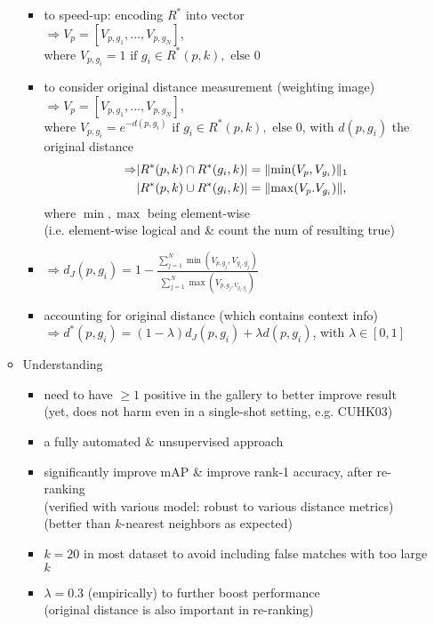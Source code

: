 \begin{itemize}
\begin{itemize}
\begin{itemize}
		\item to speed-up: encoding $R^*$ into vector \\
		$\Rightarrow V_p=[V_{p,g_1}, ..., V_{p,g_N}]$, \\
		where $V_{p,g_i} = 1 \text{ if } g_i\in R^*(p,k), \text{ else } 0$
		\item to consider original distance measurement (weighting image) \\
		$\Rightarrow V_p=[V_{p,g_1}, ..., V_{p,g_N}]$, \\
		where $V_{p,g_i} = e^{-d(p,g_i)} \text{ if } g_i\in R^*(p,k), \text{ else } 0$, with $d(p,g_i)$ the original distance
		\Item \begin{align*} \Rightarrow & \lvert R^*(p,k)\cap R^*(g_i,k)\rvert = \lVert\min(V_p, V_{g_i})\rVert_1 \\ & \lvert R^*(p,k)\cup R^*(g_i,k)\rvert = \lVert\max(V_p. V_{g_i})\rVert, \end{align*} where $\min, \max$ being element-wise \\
		(i.e. element-wise logical and \& count the num of resulting true)
		\item $\displaystyle \Rightarrow d_J(p,g_i) = 1-\frac{\sum_{j=1}^N \min(V_{p,g_j}, V_{g_i, g_j})} {\sum_{j=1}^N \max(V_{p,g_j, V_{g_i, g_j}}) }$
		\item accounting for original distance (which contains context info) \\
		$\Rightarrow d^*(p, g_i) = (1-\lambda)d_J(p, g_i) + \lambda d(p, g_i)$, with $\lambda \in [0,1]$
		\end{itemize}
	\item Understanding
		\begin{itemize}
		\item need to have $\ge1$ positive in the gallery to better improve result \\
		(yet, does not harm even in a single-shot setting, e.g. CUHK03)
		\item a fully automated \& unsupervised approach
		\item significantly improve mAP \& improve rank-1 accuracy, after re-ranking \\
		(verified with various model: robust to various distance metrics) \\
		(better than $k$-nearest neighbors as expected)
		\item $k=20$ in most dataset to avoid including false matches with too large $k$
		\item $\lambda=0.3$ (empirically) to further boost performance \\
		(original distance is also important in re-ranking)
		\end{itemize}
	\end{itemize}
\end{itemize}

